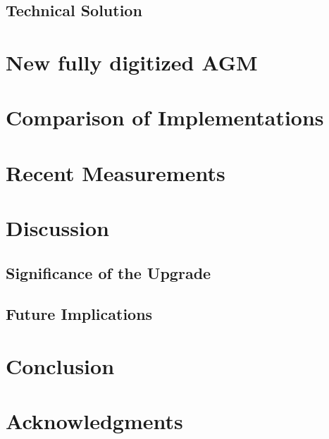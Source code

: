 

    \subsection{Technical Solution}

\section{New fully digitized AGM}
    \subsection{}

\section{Comparison of Implementations}

\section{Recent Measurements}

\section{Discussion}
    \subsection{Significance of the Upgrade}
    \subsection{Future Implications}

\section{Conclusion}
\section{Acknowledgments}








